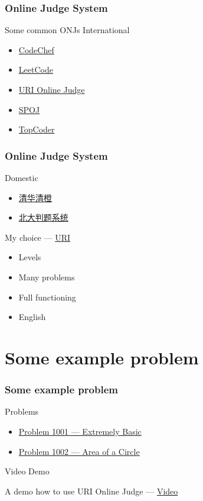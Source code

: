 \documentclass{beamer}
\begin{document}
\begin{frame}
  \frametitle{Online Judge System}
  \Huge{Some common ONJs}
  \huge International
  \begin{itemize}
  \item \href{https://www.codechef.com/}{\Large{CodeChef}}
  \item \href{https://leetcode.com/}{\Large{LeetCode}}
  \item \href{https://www.urionlinejudge.com.br/judge/en}{\Large{URI Online Judge}}
  \item \href{http://www.spoj.com/}{\Large{SPOJ}}
  \item \href{https://www.topcoder.com/}{\Large{TopCoder}}
  \end{itemize}
\end{frame}

\begin{frame}
  \frametitle{Online Judge System}
  \huge Domestic
  \begin{itemize}
  \item \href{http://www.tsinsen.com/}{\Large{清华清橙}}
  \item \href{http://poj.org/}{\Large{北大判题系统}}
  \end{itemize}
  \Huge My choice --- \href{https://www.urionlinejudge.com.br/judge/en}{URI}
  \begin{itemize}
  \item \Large{Levels}
  \item \Large{Many problems}
  \item \Large{Full functioning}
  \item \Large{English}
  \end{itemize}
\end{frame}


\section{Some example problem}
\begin{frame}
  \frametitle{Some example problem}
  \huge Problems
  \begin{itemize}
  \item \href{https://www.urionlinejudge.com.br/judge/en/problems/view/1001}{Problem 1001 --- Extremely Basic}
  \item \href{https://www.urionlinejudge.com.br/judge/en/problems/view/1002}{Problem 1002 --- Area of a Circle}
  \end{itemize}
  \huge Video Demo
  
  \Large A demo how to use URI Online Judge ---  \href{https://github.com/Puqiyuan/Latex_FIles/blob/master/acm/demo.mkv}{Video}
\end{frame}
\end{document}
